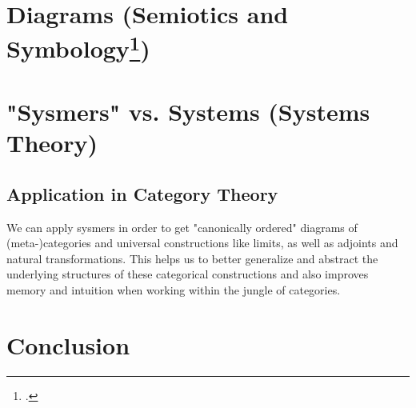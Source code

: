 \documentclass[12pt,a4paper]{article}
\begin{document}
\section{Diagrams (Semiotics and Symbology\footcite{Jung1964})} 

\section{"Sysmers" vs. Systems (Systems Theory)}

\subsection{Application in Category Theory}
We can apply sysmers in order to get "canonically ordered" diagrams of (meta-)categories and universal constructions like limits, as well as adjoints and natural transformations. This helps us to better generalize and abstract the underlying structures of these categorical constructions and also improves memory and intuition when working within the jungle of categories.


\section{Conclusion}


\printbibliography
\end{document}
